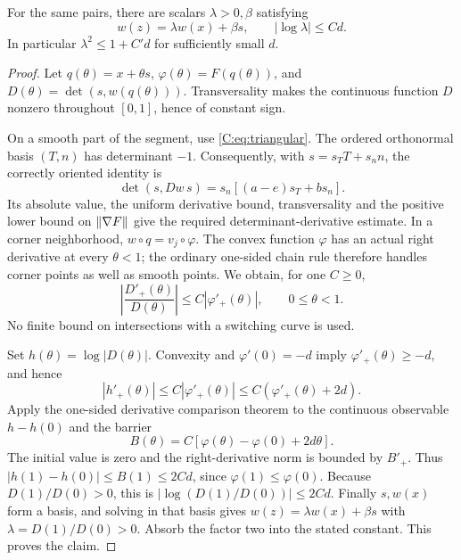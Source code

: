 \begin{lemma}\label{C:lem:transport}
For the same pairs, there are scalars $\lambda>0,\beta$ satisfying
\begin{equation}\label{C:eq:transport}
 w(z)=\lambda w(x)+\beta s,\qquad
 |\log\lambda|\le C d.
\end{equation}
In particular $\lambda^2\le1+C'd$ for sufficiently small $d$.
\end{lemma}
\begin{proof}
Let $q(\theta)=x+\theta s$, $\varphi(\theta)=F(q(\theta))$, and $D(\theta)=\det(s,w(q(\theta)))$. Transversality makes the continuous function $D$ nonzero throughout $[0,1]$, hence of constant sign.

On a smooth part of the segment, use \eqref{C:eq:triangular}. The ordered orthonormal basis $(T,n)$ has determinant $-1$. Consequently, with $s=s_TT+s_n n$, the correctly oriented identity is
\[
 \det(s,Dw\,s)=s_n[(a-e)s_T+b s_n].
\]
Its absolute value, the uniform derivative bound, transversality and the positive lower bound on $\lVert \nabla F\rVert$ give the required determinant-derivative estimate. In a corner neighborhood, $w\circ q=v_j\circ\varphi$. The convex function $\varphi$ has an actual right derivative at every $\theta<1$; the ordinary one-sided chain rule therefore handles corner points as well as smooth points. We obtain, for one $C\ge0$,
\[
 \left|\frac{D'_+(\theta)}{D(\theta)}\right|
 \le C|\varphi'_+(\theta)|,\qquad 0\le\theta<1.
\]
No finite bound on intersections with a switching curve is used.

Set $h(\theta)=\log|D(\theta)|$. Convexity and $\varphi'(0)=-d$ imply $\varphi'_+(\theta)\ge-d$, and hence
\begin{equation}\label{C:eq:variation}
 |h'_+(\theta)|\le C|\varphi'_+(\theta)|
 \le C(\varphi'_+(\theta)+2d).
\end{equation}
Apply the one-sided derivative comparison theorem to the continuous observable $h-h(0)$ and the barrier
\[
 B(\theta)=C[\varphi(\theta)-\varphi(0)+2d\theta].
\]
The initial value is zero and the right-derivative norm is bounded by $B'_+$. Thus $|h(1)-h(0)|\le B(1)\le2Cd$, since $\varphi(1)\le\varphi(0)$. Because $D(1)/D(0)>0$, this is $|\log(D(1)/D(0))|\le2Cd$. Finally $s,w(x)$ form a basis, and solving in that basis gives $w(z)=\lambda w(x)+\beta s$ with $\lambda=D(1)/D(0)>0$. Absorb the factor two into the stated constant. This proves the claim.
\end{proof}

